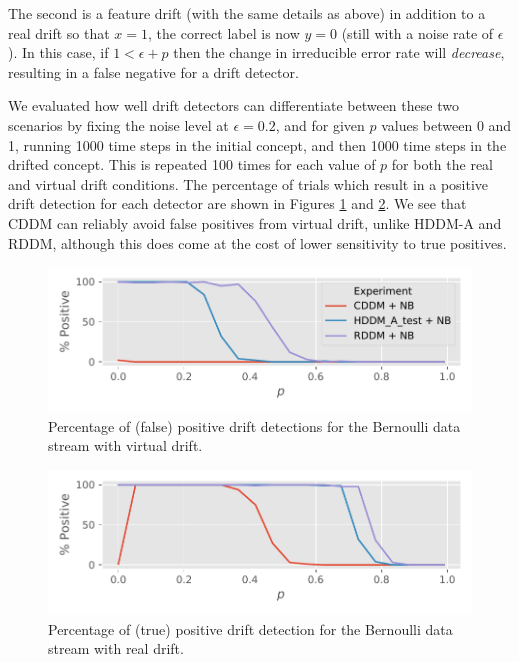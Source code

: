 The second is a feature drift (with the same details as above) in addition to a real drift so that $x=1$, the correct label is now $y=0$ (still with a noise rate of $\epsilon$). In this case, if $1<\epsilon+p$ then the change in irreducible error rate will {\it decrease}, resulting in a false negative for a drift detector. 

We evaluated how well drift detectors can differentiate between these two scenarios by fixing the noise level at $\epsilon=0.2$, and for given $p$ values between 0 and 1, running 1000 time steps in the initial concept, and then 1000 time steps in the drifted concept. This is repeated 100 times for each value of $p$ for both the real and virtual drift conditions. The percentage of trials which result in a positive drift detection for each detector are shown in Figures \ref{fig:vdrift_plot} and \ref{fig:rdrift_plot}. We see that CDDM can reliably avoid false positives from virtual drift, unlike HDDM-A and RDDM, although this does come at the cost of lower sensitivity to true positives. 

\begin{figure}
    \centering
    \includegraphics[width=\columnwidth]{images/vdrift_plot.pdf}
    \caption{Percentage of (false) positive drift detections for the Bernoulli data stream with virtual drift.}
    \label{fig:vdrift_plot}
\end{figure}
\begin{figure}
    \centering
    \includegraphics[width=\columnwidth]{images/rdrift_plot.pdf}
    \caption{Percentage of (true) positive drift detection for the Bernoulli data stream with real drift.}
    \label{fig:rdrift_plot}
\end{figure}


